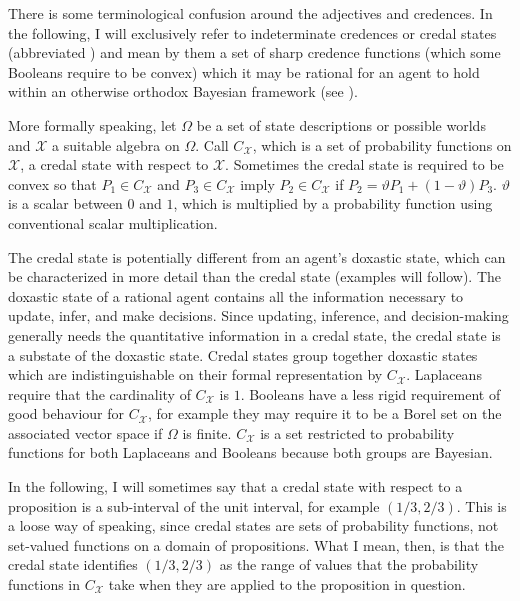 \documentclass[phd,12pt,oneside]{ubcthesis}
\begin{document}
There is some terminological confusion around the adjectives
  and  credences.
In the following, I will exclusively refer to indeterminate credences
or credal states (abbreviated ) and mean by them a set
of sharp credence functions (which some Booleans require to be convex)
which it may be rational for an agent to hold within an otherwise
orthodox Bayesian framework (see ). 

More formally speaking, let $\Omega$ be a set of state descriptions or
possible worlds and $\mathcal{X}$ a suitable algebra on $\Omega$. Call
$C_{\mathcal{X}}$, which is a set of probability functions on
$\mathcal{X}$, a credal state with respect to $\mathcal{X}$. Sometimes
the credal state is required to be convex so that
$P_{1}\in{}C_{\mathcal{X}}$ and $P_{3}\in{}C_{\mathcal{X}}$ imply
$P_{2}\in{}C_{\mathcal{X}}$ if
$P_{2}=\vartheta{}P_{1}+(1-\vartheta)P_{3}$. $\vartheta$ is a scalar
between $0$ and $1$, which is multiplied by a probability function
using conventional scalar multiplication.


The credal state is potentially different from an agent's doxastic
state, which can be characterized in more detail than the credal state
(examples will follow). The doxastic state of a rational agent
contains all the information necessary to update, infer, and make
decisions. Since updating, inference, and decision-making generally
needs the quantitative information in a credal state, the credal state
is a substate of the doxastic state. Credal states group together
doxastic states which are indistinguishable on their formal
representation by $C_{\mathcal{X}}$. Laplaceans require that the
cardinality of $C_{\mathcal{X}}$ is $1$. Booleans have a less rigid
requirement of good behaviour for $C_{\mathcal{X}}$, for example they
may require it to be a Borel set on the associated vector space if
$\Omega$ is finite. $C_{\mathcal{X}}$ is a set restricted to
probability functions for both Laplaceans and Booleans because both
groups are Bayesian.

In the following, I will sometimes say that a credal state with
respect to a proposition is a sub-interval of the unit interval, for
example $(1/3,2/3)$. This is a loose way of speaking, since credal
states are sets of probability functions, not set-valued functions on
a domain of propositions. What I mean, then, is that the credal state
identifies $(1/3,2/3)$ as the range of values that the probability
functions in $C_{\mathcal{X}}$ take when they are applied to the
proposition in question.
\end{document}
